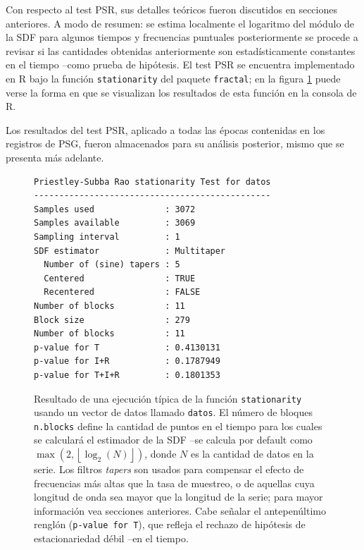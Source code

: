 Con respecto al test PSR, sus detalles te\'oricos fueron discutidos en secciones anteriores.
A modo
de resumen: se estima localmente el logaritmo del m\'odulo de la SDF
para algunos tiempos y frecuencias puntuales
posteriormente se procede a revisar
si las cantidades obtenidas anteriormente son estad\'isticamente constantes
en el tiempo --como prueba de hip\'otesis.
El test PSR se encuentra implementado en R bajo la funci\'on \texttt{stationarity}
del paquete \texttt{fractal}; en la figura \ref{res_psr} puede verse la forma en que se
visualizan los resultados de esta funci\'on en la consola de R.

Los resultados del test PSR, aplicado a todas las \'epocas contenidas en los registros de PSG,
fueron almacenados para su an\'alisis posterior, mismo que se presenta m\'as adelante.

\begin{figure}
\centering
\begin{lstlisting}
Priestley-Subba Rao stationarity Test for datos
-----------------------------------------------
Samples used              : 3072 
Samples available         : 3069 
Sampling interval         : 1 
SDF estimator             : Multitaper 
  Number of (sine) tapers : 5 
  Centered                : TRUE 
  Recentered              : FALSE 
Number of blocks          : 11 
Block size                : 279 
Number of blocks          : 11 
p-value for T             : 0.4130131 
p-value for I+R           : 0.1787949 
p-value for T+I+R         : 0.1801353 
\end{lstlisting}
\caption{Resultado de una ejecuci\'on t\'ipica de la funci\'on \texttt{stationarity}
usando un vector de datos llamado \texttt{datos}. 
El n\'umero de bloques \texttt{n.blocks} define la cantidad de puntos en el tiempo
para los cuales se calcular\'a el estimador de la SDF
--se calcula por default como
$\max \left( 2 , \left\lfloor \log_2\left( N \right) \right\rfloor \right)$, donde
$N$ es la cantidad de datos en la serie.
Los filtros \textit{tapers} son usados para compensar el efecto de frecuencias m\'as altas que la 
tasa de muestreo, o de aquellas cuya longitud de onda sea mayor que la longitud de la serie;
para mayor informaci\'on vea secciones anteriores.
Cabe se\~nalar el antepen\'ultimo rengl\'on (\texttt{p-value for T}), que refleja el rechazo de 
hip\'otesis de estacionariedad d\'ebil --en el tiempo.}
\label{res_psr}
\end{figure}

